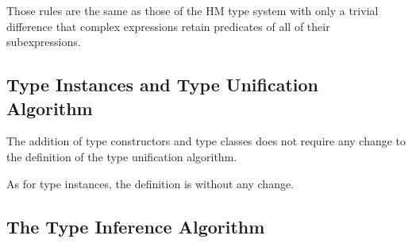 Those rules are the same as those of the HM type system with only a trivial difference that complex expressions retain predicates of all of their subexpressions.


\subsection{Type Instances and Type Unification Algorithm}


The addition of type constructors and type classes does not require any change to the definition of the type unification algorithm.

As for type instances, the definition is without any change.

\subsection{The Type Inference Algorithm}





